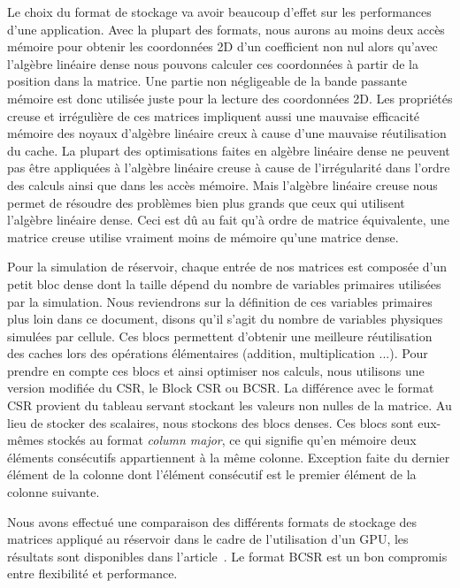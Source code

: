 Le choix du format de stockage va avoir beaucoup d'effet sur les performances d'une application.
%
Avec la plupart des formats, nous aurons au moins deux accès mémoire pour obtenir les coordonnées 2D d'un coefficient non nul alors qu'avec l'algèbre linéaire dense nous pouvons calculer ces coordonnées à partir de la position dans la matrice.
%
Une partie non négligeable de la bande passante mémoire est donc utilisée juste pour la lecture des coordonnées 2D.
%
Les propriétés creuse et irrégulière de ces matrices impliquent aussi une mauvaise efficacité mémoire des noyaux d'algèbre linéaire creux à cause d'une mauvaise réutilisation du cache.
%
La plupart des optimisations faites en algèbre linéaire dense ne peuvent pas être appliquées à l'algèbre linéaire creuse à cause de l'irrégularité dans l'ordre des calculs ainsi que dans les accès mémoire.
%
Mais l'algèbre linéaire creuse nous permet de résoudre des problèmes bien plus grands que ceux qui utilisent l'algèbre linéaire dense.
%
Ceci est dû au fait qu'à ordre de matrice équivalente, une matrice creuse utilise vraiment moins de mémoire qu'une matrice dense.


Pour la simulation de réservoir, chaque entrée de nos matrices est composée d'un petit bloc dense dont la taille dépend du nombre de variables primaires utilisées par la simulation.
%
Nous reviendrons sur la définition de ces variables primaires plus loin dans ce document, disons qu'il s'agit du nombre de variables physiques simulées par cellule.
%
Ces blocs permettent d'obtenir une meilleure réutilisation des caches lors des opérations élémentaires (addition, multiplication ...).
%
Pour prendre en compte ces blocs et ainsi optimiser nos calculs, nous utilisons une version modifiée du CSR, le Block CSR ou BCSR.
%
La différence avec le format CSR provient du tableau servant stockant les valeurs non nulles de la matrice.
%
Au lieu de stocker des scalaires, nous stockons des blocs denses.
%
Ces blocs sont eux-mêmes stockés au format {\em column major}, ce qui signifie qu'en mémoire deux éléments consécutifs appartiennent à la même colonne.
%
Exception faite du dernier élément de la colonne dont l'élément consécutif est le premier élément de la colonne suivante.


Nous avons effectué une comparaison des différents formats de stockage des matrices appliqué au réservoir dans le cadre de l'utilisation d'un GPU, les résultats sont disponibles dans l'article~\cite{Renpar}.
%
Le format BCSR est un bon compromis entre flexibilité et performance.

